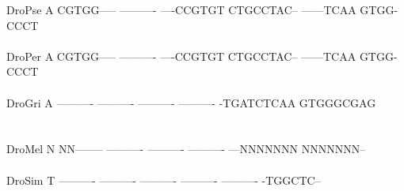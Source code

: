 \documentclass[11pt,twoside,reqno,a4paper]{article}
\begin{document}
{DroPse	A	CGTGG-----	----------	----CCGTGT	CTGCCTAC--	------TCAA	GTGG-CCCT\\
\hspace*{7\charwidth}\hspace*{1\charwidth}\hspace*{1\charwidth}\hspace*{1\charwidth}\hspace*{1\charwidth}\hspace*{1\charwidth}\hspace*{1\charwidth}\\
DroPer	A	CGTGG-----	----------	----CCGTGT	CTGCCTAC--	------TCAA	GTGG-CCCT\\
\hspace*{7\charwidth}\hspace*{1\charwidth}\hspace*{1\charwidth}\hspace*{1\charwidth}\hspace*{1\charwidth}\hspace*{1\charwidth}\hspace*{1\charwidth}\\
DroGri	A	----------	----------	----------	----------	-TGATCTCAA	GTGGGCGAG\\
\hspace*{7\charwidth}\hspace*{1\charwidth}\hspace*{1\charwidth}\hspace*{1\charwidth}\hspace*{1\charwidth}\hspace*{1\charwidth}\hspace*{1\charwidth}\\
\\
DroMel	N	NN--------	----------	----------	----------	---NNNNNNN	NNNNNNN--\\
\hspace*{7\charwidth}\hspace*{1\charwidth}\hspace*{1\charwidth}\hspace*{1\charwidth}\hspace*{1\charwidth}\hspace*{1\charwidth}\hspace*{1\charwidth}\\
DroSim	T	----------	----------	----------	----------	----------	-TGGCTC--\\
\hspace*{7\charwidth}\hspace*{1\charwidth}\hspace*{1\charwidth}\hspace*{1\charwidth}\hspace*{1\charwidth}\hspace*{1\charwidth}\hspace*{1\charwidth}\\
}
\end{document}

